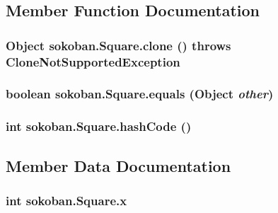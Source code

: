 \subsection{Member Function Documentation}
\hypertarget{classsokoban_1_1Square_19bf1b433cc3cddf0916801da70a0e54}{
\subsubsection[{clone}]{\setlength{\rightskip}{0pt plus 5cm}Object sokoban.Square.clone ()  throws CloneNotSupportedException 	}}
\label{classsokoban_1_1Square_19bf1b433cc3cddf0916801da70a0e54}


\hypertarget{classsokoban_1_1Square_e564dcbcc5fc8f53ce582f46e52bae99}{
\subsubsection[{equals}]{\setlength{\rightskip}{0pt plus 5cm}boolean sokoban.Square.equals (Object {\em other})}}
\label{classsokoban_1_1Square_e564dcbcc5fc8f53ce582f46e52bae99}


\hypertarget{classsokoban_1_1Square_a8faa6bf5fc89790e7904b137848819c}{
\subsubsection[{hashCode}]{\setlength{\rightskip}{0pt plus 5cm}int sokoban.Square.hashCode ()}}
\label{classsokoban_1_1Square_a8faa6bf5fc89790e7904b137848819c}




\subsection{Member Data Documentation}
\hypertarget{classsokoban_1_1Square_8f41c9647f12a24f565a82f52c8b05ae}{
\subsubsection[{x}]{\setlength{\rightskip}{0pt plus 5cm}int {\bf sokoban.Square.x}}}
\label{classsokoban_1_1Square_8f41c9647f12a24f565a82f52c8b05ae}


